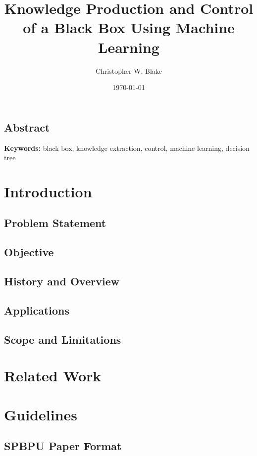 \documentclass[a4paper,twoside,12pt]{book}
\title{Knowledge Production and Control of a Black Box Using Machine Learning}
\author{Christopher W. Blake}
\date{\today}
\newcommand{\keywords}{black box, knowledge extraction, control, machine learning, decision tree}
\begin{document}
	\makeatletter
	\@openrightfalse
	\makeatother

	

	\frontmatter \pagestyle{frontmatter}
		
		\section*{Abstract}
			 \linebreak
			\linebreak
			\textbf{Keywords: }\keywords
		\tableofcontents
		\listoffigures
		\listoftables
		\listofalgorithms

	\mainmatter \pagestyle{mainmatter}
		\chapter{Introduction} 
			\section{Problem Statement} 
			\section{Objective} 
			\section{History and Overview} 
			\section{Applications}  
			\section{Scope and Limitations} 
		\chapter{Related Work} 
		\chapter{Guidelines} 
			\section{SPBPU Paper Format}  
\end{document}
